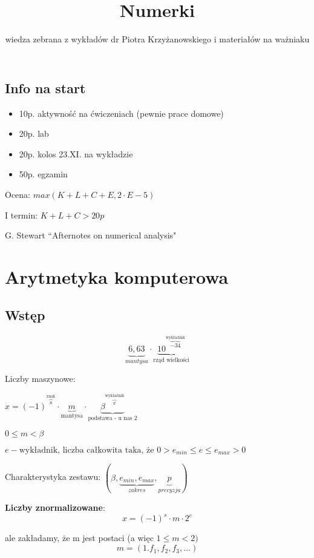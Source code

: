 \documentclass[hidelinks,a4paper,fleqn,oneside]{book}
\author{wiedza zebrana z wykładów dr Piotra Krzyżanowskiego i materiałów na ważniaku}
\title{Numerki}
\begin{document}
\linespread{1.0}
\maketitle

\tableofcontents

\clearpage

\section*{Info na start}

\begin{itemize}
	\item 10p. aktywność na ćwiczeniach (pewnie prace domowe)
	\item 20p. lab
	\item 20p. kolos 23.XI. na wykładzie
	\item 50p. egzamin
\end{itemize}

Ocena: $max(K + L + C + E, 2 \cdot E - 5)$

I termin: $K + L + C > 20p$

G. Stewart ``Afternotes on numerical analysis"

\chapter{Arytmetyka komputerowa}

\section{Wstęp}
\[
	\underbrace{6,63}_{mantysa} \cdot \underbrace{10^{\overbrace{-34}^{\textrm{wykładnik}}}}_{\textrm{rząd wielkości}}
\]

Liczby maszynowe:

$x = (-1)^{\overbrace{s}^{\textrm{znak}}} \cdot \underbrace{m}_{\textrm{mantysa}} \cdot \underbrace{\beta^{\overbrace{e}^{\textrm{wykładnik}}}}_{\textrm{podstawa - u nas 2}}$

$0 \leq m < \beta$

$e - \textrm{wykładnik, liczba całkowita taka, że } 0 > e_{min} \leq e \leq e_{max} > 0$

Charakterystyka zestawu: $(\beta, \underbrace{e_{min}, e_{max}}_{zakres}, \underbrace{p}_{precyzja})$

\textbf{Liczby znormalizowane}:
\[
	x = (-1)^s \cdot m \cdot 2^e
\]

ale zakładamy, że m jest postaci (a więc $1 \leq m < 2)$
\[
	m = (1.f_1,f_2,f_3,...)
\]
\end{document}
